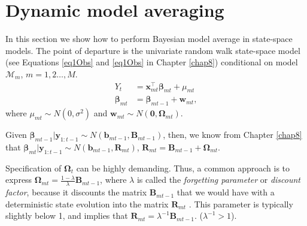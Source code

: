 
\section{Dynamic model averaging}\label{sec10_3A}

In this section we show how to perform Bayesian model average in state-space models. The point of departure is the univariate random walk state-space model (see Equations \ref{eq1Obs} and \ref{eq1Obs} in Chapter \ref{chap8}) conditional on model $\mathcal{M}_m$, $m=1,2\dots,M$. 
\begin{align}
	Y_t&=\bm{x}_{mt}^{\top}\bm{\beta}_{mt}+\mu_{mt}\\
	\bm{\beta}_{mt}&=\bm{\beta}_{mt-1}+\bm{w}_{mt},
\end{align}
where $\mu_{mt}\sim N(0,\sigma^2)$ and $\bm{w}_{mt}\sim N(\bm{0},\bm{\Omega}_{mt})$.

Given $\bm{\beta}_{mt-1}|\bm{y}_{1:t-1}\sim N(\bm{b}_{mt-1},\bm{B}_{mt-1})$, then, we know from Chapter \ref{chap8} that $\bm{\beta}_{mt}|\bm{y}_{1:t-1}\sim N(\bm{b}_{mt-1}, \bm{R}_{mt})$, $\bm{R}_{mt}=\bm{B}_{mt-1}+\bm{\Omega}_{mt}$. 

Specification of $\bm{\Omega}_t$ can be highly demanding. Thus, a common approach is to express $\bm{\Omega}_{mt}=\frac{1-\lambda}{\lambda}\bm{B}_{mt-1}$, where $\lambda$ is called the \textit{forgetting parameter} or \textit{discount factor}, because it discounts the matrix $\bm{B}_{mt-1}$ that we would have with a deterministic state evolution into the matrix $\bm{R}_{mt}$ \cite[Chap.~4]{petris2009dynamic}. This parameter is typically slightly below 1, and implies that $\bm{R}_{mt}=\lambda^{-1}\bm{B}_{mt-1}$. ($\lambda^{-1}>1$).

